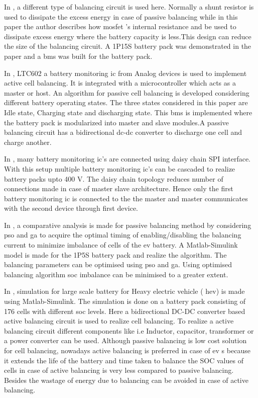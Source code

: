 In \cite{ls3}, a different type of balancing circuit is used here. Normally a shunt resistor is used to dissipate the excess energy in case of passive balancing while in this paper the author describes how \acrshort{mosfet} 's internal resistance and be used to dissipate excess energy where the battery capacity is less.This design can reduce the size of the balancing circuit. A 1P15S battery pack was demonstrated in the paper and a \acrshort{bms} was built for the battery pack.

In \cite{ls4}, LTC602 a battery monitoring \acrshort{ic}  from Analog devices is used to implement active cell balancing. It is integrated with a microcontroller which acts as a master or host. An algorithm for passive cell balancing is developed considering different battery operating states. The three states considered in this paper are Idle state, Charging state and discharging state. This \acrshort{bms} is implemented where the battery pack is modularized into master and slave modules.A passive balancing circuit has a bidirectional \acrshort{dc}-\acrshort{dc} converter to discharge one cell and charge another.   

In \cite{ls5}, many battery monitoring \acrshort{ic}'s are connected using daisy chain SPI interface. With this setup multiple battery monitoring \acrshort{ic}'s can be cascaded to realize battery packs upto 400 V. The daisy chain topology reduces number of connections made in case of master slave architecture. Hence only the first battery monitoring \acrshort{ic} is connected to the the master and master communicates with the second device through first device.  

In \cite{ls6}, a comparative analysis is made for passive balancing method by considering  \acrfull{pso} and \acrfull{ga} to acquire the optimal timing of enabling/disabling the balancing current to minimize imbalance of cells of the \acrshort{ev} battery. A Matlab-Simulink model is made for the 1P5S battery pack and realize the algorithm. The balancing parameters can be optimised using \acrshort{pso} and \acrshort{ga}. Using optimised balancing algorithm \acrshort{soc} imbalance can be minimised to a greater extent.     

In \cite{ls7}, simulation for large scale battery for Heavy electric vehicle ( \acrshort{hev}) is made using Matlab-Simulink. The simulation is done on a battery pack consisting of 176 cells with different \acrshort{soc} levels. Here a bidirectional DC-DC converter based active balancing circuit is used to realize cell balancing. To realize a active balancing circuit  different components like i.e Inductor, capacitor, transformer or a power converter can be used. Although passive balancing is low cost solution for cell balancing, nowadays active balancing is preferred in case of \acrshort{ev} s because it extends the life of the battery and time taken to balance the SOC values of cells in case of active balancing is very less compared to passive balancing. Besides the wastage of energy due to balancing can be avoided in case of active balancing. 

